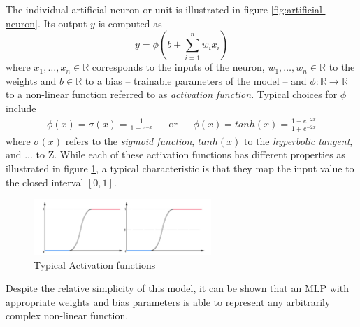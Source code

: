 The individual artificial neuron or unit is illustrated in figure \ref{fig:artificial-neuron}. Its output $y$ is computed as 
\begin{equation}
	y = \phi(b + \sum_{i=1}^{n} w_i x_i)
\end{equation}
where $x_1, \ldots, x_n \in \mathbb{R}$ corresponds to the inputs of the neuron, $w_1, \dots, w_n\in \mathbb{R}$ to the weights and $b \in \mathbb{R}$ to a bias -- trainable parameters of the model -- and $\phi: \mathbb{R} \rightarrow \mathbb{R}$ to a non-linear function referred to as \emph{activation function}. Typical choices for $\phi$ include 
\begin{align*} 
\phi(x) = \sigma(x) = \frac{1}{1 + e^{-x}} && \text{or} && \phi(x) = tanh(x) = \frac{1  - e^{-2x}}{1  + e^{-2x}}
\end{align*} 
where $\sigma(x)$ refers to the \emph{sigmoid function}, $tanh(x)$ to the \emph{hyperbolic tangent}, and 
... to Z. While each of these activation functions has different properties as illustrated in figure \ref{fig:activation-functions}, a typical characteristic is that they map the input value to the closed interval $[0, 1]$. 

\begin{figure}[h]
	\caption{Typical Activation functions}\label{fig:activation-functions}   
	\centering
	\includegraphics[width=0.6\textwidth]{figures/chapter-2/activation-functions.png}
\end{figure}


%

Despite the relative simplicity of this model, it can be shown that an MLP with appropriate weights and bias parameters is able to represent any arbitrarily complex non-linear function.%

